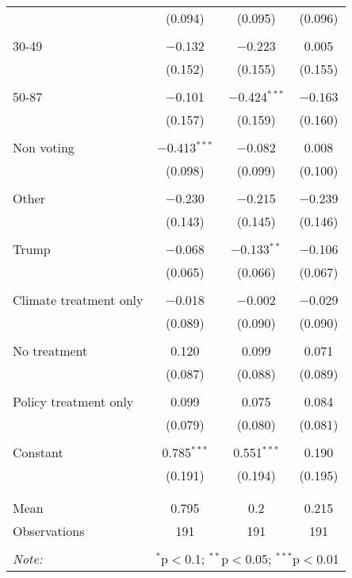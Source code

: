 \begin{tabular}{@{\extracolsep{5pt}}lccc}
  & (0.094) & (0.095) & (0.096) \\ 
  & & & \\ 
 30-49 & $-$0.132 & $-$0.223 & 0.005 \\ 
  & (0.152) & (0.155) & (0.155) \\ 
  & & & \\ 
 50-87 & $-$0.101 & $-$0.424$^{***}$ & $-$0.163 \\ 
  & (0.157) & (0.159) & (0.160) \\ 
  & & & \\ 
 Non voting & $-$0.413$^{***}$ & $-$0.082 & 0.008 \\ 
  & (0.098) & (0.099) & (0.100) \\ 
  & & & \\ 
 Other & $-$0.230 & $-$0.215 & $-$0.239 \\ 
  & (0.143) & (0.145) & (0.146) \\ 
  & & & \\ 
 Trump & $-$0.068 & $-$0.133$^{**}$ & $-$0.106 \\ 
  & (0.065) & (0.066) & (0.067) \\ 
  & & & \\ 
 Climate treatment only & $-$0.018 & $-$0.002 & $-$0.029 \\ 
  & (0.089) & (0.090) & (0.090) \\ 
  & & & \\ 
 No treatment & 0.120 & 0.099 & 0.071 \\ 
  & (0.087) & (0.088) & (0.089) \\ 
  & & & \\ 
 Policy treatment only & 0.099 & 0.075 & 0.084 \\ 
  & (0.079) & (0.080) & (0.081) \\ 
  & & & \\ 
 Constant & 0.785$^{***}$ & 0.551$^{***}$ & 0.190 \\ 
  & (0.191) & (0.194) & (0.195) \\ 
  & & & \\ 
\hline \\[-1.8ex] 
Mean & 0.795 & 0.2 & 0.215 \\ 
Observations & 191 & 191 & 191 \\ 
\hline 
\hline \\[-1.8ex] 
\textit{Note:}  & \multicolumn{3}{r}{$^{*}$p$<$0.1; $^{**}$p$<$0.05; $^{***}$p$<$0.01} \\ 
\end{tabular} 
